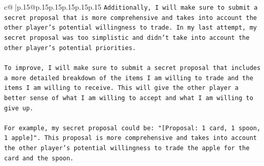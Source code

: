 \documentclass{article}
\begin{document}
{\begin{supertabular}{c@{$\;$}|p{.15\linewidth}@{}p{.15\linewidth}p{.15\linewidth}p{.15\linewidth}p{.15\linewidth}p{.15\linewidth}}
{{{\texttt{Additionally, I will make sure to submit a secret proposal that is more comprehensive and takes into account the other player's potential willingness to trade. In my last attempt, my secret proposal was too simplistic and didn't take into account the other player's potential priorities.} \\
\\ 
\texttt{To improve, I will make sure to submit a secret proposal that includes a more detailed breakdown of the items I am willing to trade and the items I am willing to receive. This will give the other player a better sense of what I am willing to accept and what I am willing to give up.} \\
\\ 
\texttt{For example, my secret proposal could be: "{[}Proposal: 1 card, 1 spoon, 1 apple{]}". This proposal is more comprehensive and takes into account the other player's potential willingness to trade the apple for the card and the spoon.} \\
            }
        }
    }
     \\ \\

\end{supertabular}
}
\end{document}
